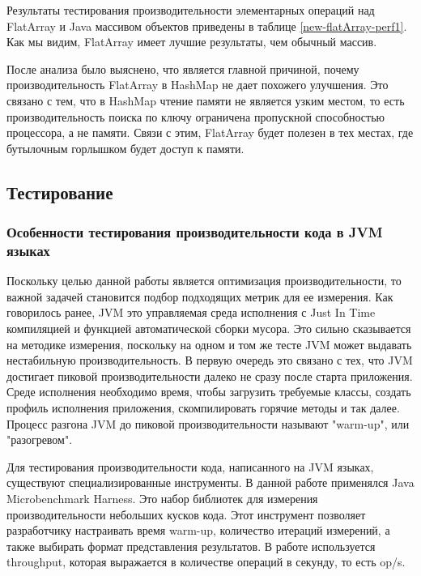 Результаты тестирования производительности элементарных операций над FlatArray и Java массивом объектов приведены в таблице \ref{new-flatArray-perf1}. Как мы видим, FlatArray имеет лучшие результаты, чем обычный массив.
\par
После анализа было выяснено, что является главной причиной, почему производительность FlatArray в HashMap не дает похожего улучшения. Это связано с тем, что в HashMap чтение памяти не является узким местом, то есть производительность поиска по ключу ограничена пропускной способностью процессора, а не памяти. Связи с этим, FlatArray будет полезен в тех местах, где бутылочным горлышком будет доступ к памяти.

\subsection{Тестирование} \label{benchmarks}
\subsubsection{Особенности тестирования производительности кода в JVM языках}
Поскольку целью данной работы является оптимизация производительности, то важной задачей становится подбор подходящих метрик для ее измерения.
Как говорилось ранее, JVM это управляемая среда исполнения с Just In Time компиляцией и функцией автоматической сборки мусора. Это сильно сказывается на методике измерения, поскольку на одном и том же тесте JVM может выдавать нестабильную производительность. 
В первую очередь это связано с тех, что JVM достигает пиковой производительности далеко не сразу после старта приложения.
Среде исполнения необходимо время, чтобы загрузить требуемые классы, создать профиль исполнения приложения, скомпилировать горячие методы и так далее.
Процесс разгона JVM до пиковой производительности называют "warm-up", или "разогревом".
\par
Для тестирования производительности кода, написанного на JVM языках, существуют специализированные инструменты. 
В данной работе применялся Java Microbenchmark Harness\cite{jmh}. Это набор библиотек для измерения производительности небольших кусков кода.
Этот инструмент позволяет разработчику настраивать время warm-up, количество итераций измерений, а также выбирать формат представления результатов. 
В работе используется throughput, которая выражается в количестве операций в секунду, то есть op/s. 

